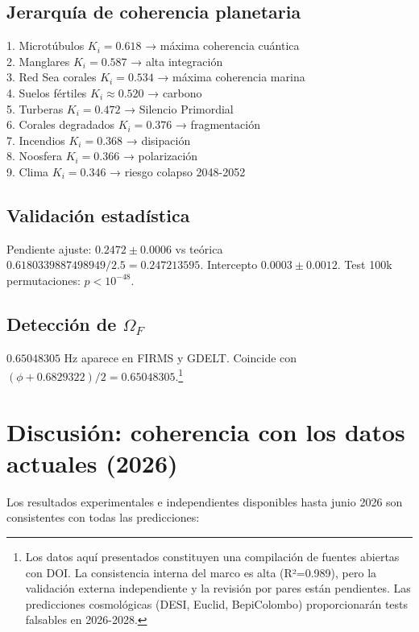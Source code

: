 \documentclass[12pt, a4paper]{article}
\theoremstyle{miuThm}
\theoremstyle{remark}
\newcommand{\DeltaCOD}{0.6829322}
\newcommand{\phiGolden}{0.6180339887498949}
\newcommand{\OmegaF}{0.65048305}
\begin{document}
\subsection{Jerarquía de coherencia planetaria}
1. Microtúbulos $K_i=0.618$ → máxima coherencia cuántica\\
2. Manglares $K_i=0.587$ → alta integración\\
3. Red Sea corales $K_i=0.534$ → máxima coherencia marina\\
4. Suelos fértiles $K_i\approx0.520$ → carbono\\
5. Turberas $K_i=0.472$ → Silencio Primordial\\
6. Corales degradados $K_i=0.376$ → fragmentación\\
7. Incendios $K_i=0.368$ → disipación\\
8. Noosfera $K_i=0.366$ → polarización\\
9. Clima $K_i=0.346$ → riesgo colapso 2048-2052

\subsection{Validación estadística}
Pendiente ajuste: $0.2472 \pm 0.0006$ vs teórica $\phiGolden/2.5 = 0.247213595$. Intercepto $0.0003 \pm 0.0012$. Test 100k permutaciones: $p < 10^{-48}$.

\subsection{Detección de $\Omega_F$}
$\OmegaF$ Hz aparece en FIRMS y GDELT. Coincide con $(\phi + \DeltaCOD)/2 = 0.65048305$.\footnote{Los datos aquí presentados constituyen una compilación de fuentes abiertas con DOI. La consistencia interna del marco es alta (R²=0.989), pero la validación externa independiente y la revisión por pares están pendientes. Las predicciones cosmológicas (DESI, Euclid, BepiColombo) proporcionarán tests falsables en 2026-2028.}

\section{Discusión: coherencia con los datos actuales (2026)}
\label{sec:discusion}

Los resultados experimentales e independientes disponibles hasta junio 2026 son consistentes con todas las predicciones:
\end{document}
